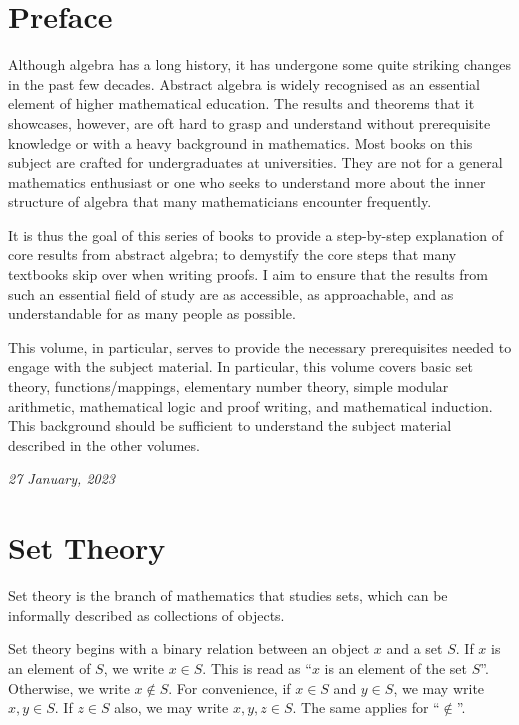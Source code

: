 \newpage

\chapter*{Preface}
Although algebra has a long history, it has undergone some quite striking changes in the past few decades. Abstract algebra is widely recognised as an essential element of higher mathematical education. The results and theorems that it showcases, however, are oft hard to grasp and understand without prerequisite knowledge or with a heavy background in mathematics. Most books on this subject are crafted for undergraduates at universities. They are not for a general mathematics enthusiast or one who seeks to understand more about the inner structure of algebra that many mathematicians encounter frequently.

It is thus the goal of this series of books to provide a step-by-step explanation of core results from abstract algebra; to demystify the core steps that many textbooks skip over when writing proofs. I aim to ensure that the results from such an essential field of study are as accessible, as approachable, and as understandable for as many people as possible.

This volume, in particular, serves to provide the necessary prerequisites needed to engage with the subject material. In particular, this volume covers basic set theory, functions/mappings, elementary number theory, simple modular arithmetic, mathematical logic and proof writing, and mathematical induction. This background should be sufficient to understand the subject material described in the other volumes.

\hfill{\textit{27 January, 2023}}
\newpage

\tableofcontents
\setcounter{part}{0}

\chapter{Set Theory}
Set theory is the branch of mathematics that studies sets, which can be informally described as collections of objects.

Set theory begins with a binary relation between an object $x$ and a set $S$. If $x$ is an element of $S$, we write $x \in S$. This is read as ``$x$ is an element of the set $S$''. Otherwise, we write $x \notin S$. For convenience, if $x \in S$ and $y \in S$, we may write $x, y \in S$. If $z \in S$ also, we may write $x, y, z \in S$. The same applies for ``$\notin$''.

